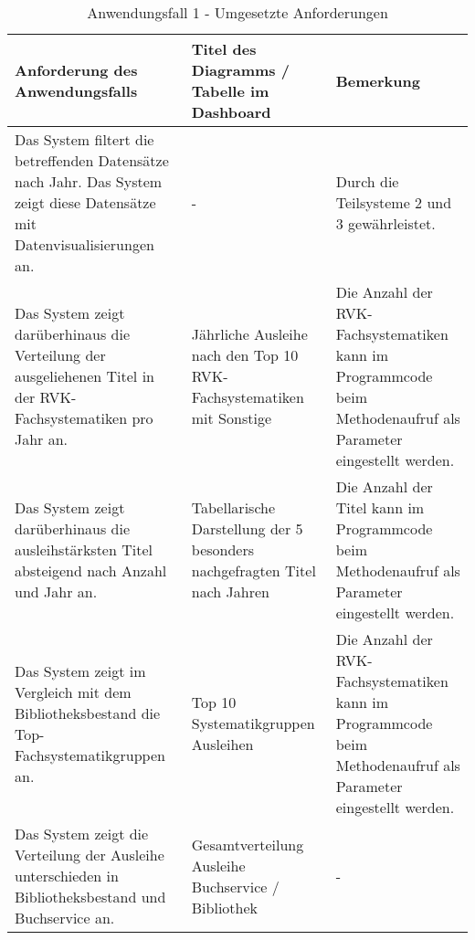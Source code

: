 \begingroup
    \setlength{\tabcolsep}{12pt} %
    \renewcommand{\arraystretch}{1.5} 
    \begin{table}[H]
        \centering
        \begin{adjustbox}{max width=\textwidth}
        \begin{tabular}{p{}p{}p{}}
           \toprule
           Anforderung des Anwendungsfalls        &Titel des Diagramms / Tabelle im Dashboard &Bemerkung\\
           \midrule
           Das System filtert die betreffenden Datensätze nach Jahr. Das System zeigt diese Datensätze mit Datenvisualisierungen an.&-&Durch die Teilsysteme 2  und 3 gewährleistet.\\
           Das System zeigt darüberhinaus die Verteilung der ausgeliehenen Titel in der RVK-Fachsystematiken pro Jahr an.&Jährliche Ausleihe nach den Top 10 RVK-Fachsystematiken mit Sonstige& Die Anzahl der RVK-Fachsystematiken kann im Programmcode beim Methodenaufruf als Parameter eingestellt werden.\\
           Das System zeigt darüberhinaus die ausleihstärksten Titel absteigend nach Anzahl und Jahr an.& Tabellarische Darstellung der 5 besonders nachgefragten Titel nach Jahren&Die Anzahl der Titel kann im Programmcode beim Methodenaufruf als Parameter eingestellt werden.\\
           Das System zeigt im Vergleich mit dem Bibliotheksbestand die Top-Fachsystematikgruppen an.&Top 10 Systematikgruppen Ausleihen\footnotemark&Die Anzahl der RVK-Fachsystematiken kann im Programmcode beim Methodenaufruf als Parameter eingestellt werden.\\
           Das System zeigt die Verteilung der Ausleihe unterschieden in Bibliotheksbestand und Buchservice an.&Gesamtverteilung Ausleihe Buchservice / Bibliothek&-\\
        \bottomrule
        \end{tabular}
        \end{adjustbox}
        \caption{%
            Anwendungsfall 1 - Umgesetzte Anforderungen
        }
        \label{tab:Anwendungsfall 1 - Umgesetzte Anforderungen}
        \end{table}


    \endgroup

